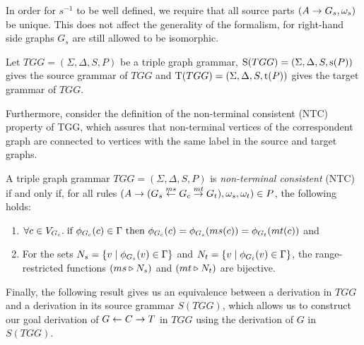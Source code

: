 In order for $s^{-1}$ to be well defined, we require that all source parts $(A \pro G_s,\omega_s)$ be unique. This does not affect the generality of the formalism, for right-hand side graphs $G_s$ are still allowed to be isomorphic.

\begin{definition}
	\label{def:Source}
	Let $TGG = (\Sigma, \Delta, S, P)$ be a triple graph grammar, $\Source(TGG) = (\Sigma, \Delta, S, \source(P))$ gives the source grammar of $TGG$ and $\Target(TGG) = (\Sigma, \Delta, S, \target(P))$ gives the target grammar of $TGG$.
\end{definition}

Furthermore, consider the definition of the non-terminal consistent (NTC) property of TGG, which assures that non-terminal vertices of the correspondent graph are connected to vertices with the same label in the source and target graphs.

\begin{definition}
	A triple graph grammar $TGG = (\Sigma, \Delta, S, P)$ is \emph{non-terminal consistent} (NTC) if and only if, for all rules $(A \pro (G_s \ms{ms} G_c \mt{mt} G_t), \omega_s, \omega_t) \in P$, the following holds:
	\begin{enumerate}
		\item $\forall c \in V_{G_c} \. \text{if } \phi_{G_c}(c) \in \Gamma \text{ then } \phi_{G_c}(c) = \phi_{G_s}(ms(c)) = \phi_{G_t}(mt(c))$ and
		\item For the sets $N_s = \{v \st \phi_{G_s}(v) \in \Gamma\}$ and $N_t = \{v \st \phi_{G_t}(v) \in \Gamma\}$, the range-restricted functions $(ms \rrestr N_s)$ and $(mt \rrestr N_t)$ are bijective.
	\end{enumerate}
\end{definition}

Finally, the following result gives us an equivalence between a derivation in $TGG$ and a derivation in its source grammar $S(TGG)$, which allows us to construct our goal derivation of $G \ms{} C \mt{} T$ in $TGG$ using the derivation of $G$ in $S(TGG)$.

